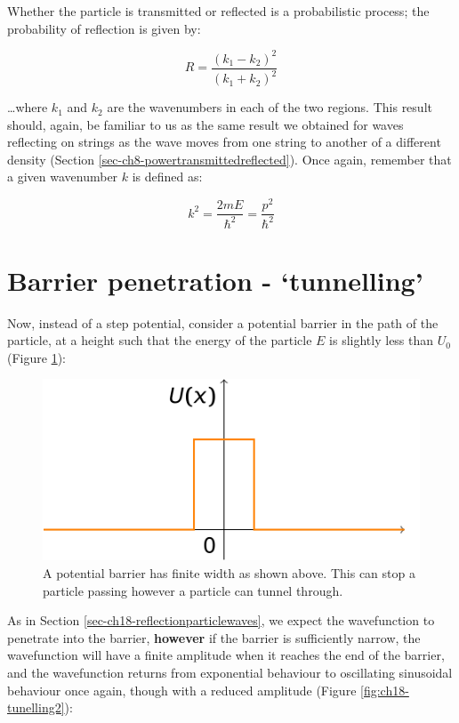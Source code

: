 \documentclass[
]{book}
\begin{document}
Whether the particle is transmitted or reflected is a probabilistic process; the probability of reflection is given by:

\begin{equation}
R = \frac{(k_1 - k_2)^2}{(k_1 + k_2)^2}
\end{equation}

\ldots where \(k_1\) and \(k_2\) are the wavenumbers in each of the two regions. This result should, again, be familiar to us as the same result we obtained for waves reflecting on strings as the wave moves from one string to another of a different density (Section \ref{sec-ch8-powertransmittedreflected}). Once again, remember that a given wavenumber \(k\) is defined as:

\begin{equation}
k^2 = \frac{2mE}{\hbar^2} = \frac{p^2}{\hbar^2}
\end{equation}

\hypertarget{sec-ch18-tunnelling1}{%
\section{Barrier penetration - `tunnelling'}\label{sec-ch18-tunnelling1}}

Now, instead of a step potential, consider a potential barrier in the path of the particle, at a height such that the energy of the particle \(E\) is slightly less than \(U_0\) (Figure \ref{fig:ch18-tunelling1}):

\begin{figure}

{\centering \includegraphics[width=0.7\linewidth]{visualisations/LaTeX/ch18-pestep3} 

}

\caption{A potential barrier has finite width as shown above. This can stop a particle passing however a particle can tunnel through.}\label{fig:ch18-tunelling1}
\end{figure}

As in Section \ref{sec-ch18-reflectionparticlewaves}, we expect the wavefunction to penetrate into the barrier, \textbf{however} if the barrier is sufficiently narrow, the wavefunction will have a finite amplitude when it reaches the end of the barrier, and the wavefunction returns from exponential behaviour to oscillating sinusoidal behaviour once again, though with a reduced amplitude (Figure \ref{fig:ch18-tunelling2}):
\end{document}
